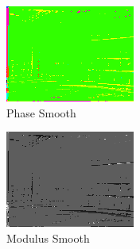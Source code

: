 \documentclass[10pt]{report}
\begin{document}
\begin{figure}[H]
\centering
        \begin{subfigure}[b]{0.3\textwidth}
                \centering
                \includegraphics[width=\textwidth]{D1-angle.png}
                \caption{Phase Smooth}
                \label{fig:ps}
        \end{subfigure}
        \begin{subfigure}[b]{0.3\textwidth}
                \centering
                \includegraphics[width=\textwidth]{D1-norm.png}
                \caption{Modulus Smooth}
                \label{fig:tiger}
        \end{subfigure}
        \begin{subfigure}[b]{0.3\textwidth}

\end{subfigure}
\end{figure}
\end{document}
